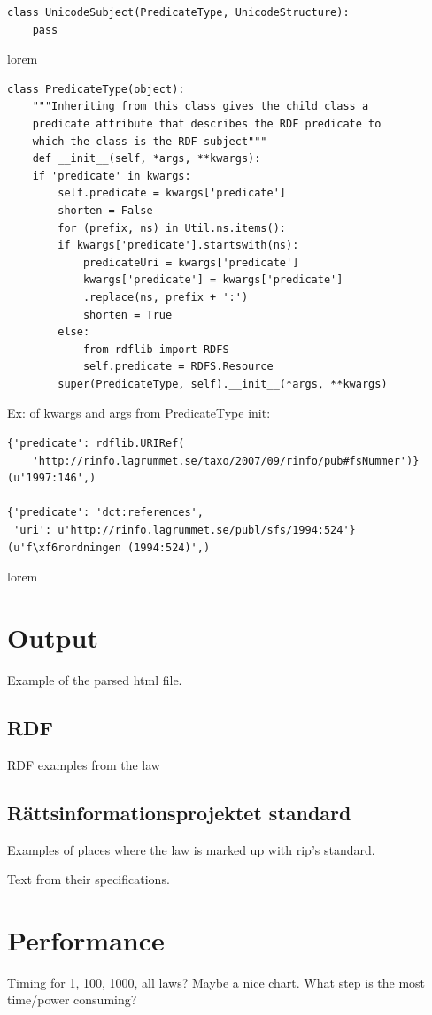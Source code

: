 \begin{verbatim}
class UnicodeSubject(PredicateType, UnicodeStructure):
	pass
\end{verbatim} 
\linebreak
\newline
lorem\\
\begin{verbatim}
class PredicateType(object):
    """Inheriting from this class gives the child class a 
    predicate attribute that describes the RDF predicate to 
    which the class is the RDF subject"""
    def __init__(self, *args, **kwargs):
	if 'predicate' in kwargs:
	    self.predicate = kwargs['predicate']
	    shorten = False
	    for (prefix, ns) in Util.ns.items():
		if kwargs['predicate'].startswith(ns):
		    predicateUri = kwargs['predicate']
		    kwargs['predicate'] = kwargs['predicate']
			.replace(ns, prefix + ':')	
		    shorten = True
		else:
		    from rdflib import RDFS
		    self.predicate = RDFS.Resource
	    super(PredicateType, self).__init__(*args, **kwargs)
\end{verbatim} 
\linebreak
\newline
Ex: of kwargs and args from PredicateType init:\\
\begin{verbatim}
{'predicate': rdflib.URIRef(
    'http://rinfo.lagrummet.se/taxo/2007/09/rinfo/pub#fsNummer')}
(u'1997:146',)

{'predicate': 'dct:references', 
 'uri': u'http://rinfo.lagrummet.se/publ/sfs/1994:524'}
(u'f\xf6rordningen (1994:524)',)
\end{verbatim} 
\linebreak
\newline
lorem\\


\section{Output}
Example of the parsed html file.
\subsection{RDF}
RDF examples from the law

\subsection{Rättsinformationsprojektet standard}
Examples of places where the law is marked up with rip's standard. 

Text from their specifications.

\section{Performance}
Timing for 1, 100, 1000, all laws? Maybe a nice chart. 
What step is the most time/power consuming?
